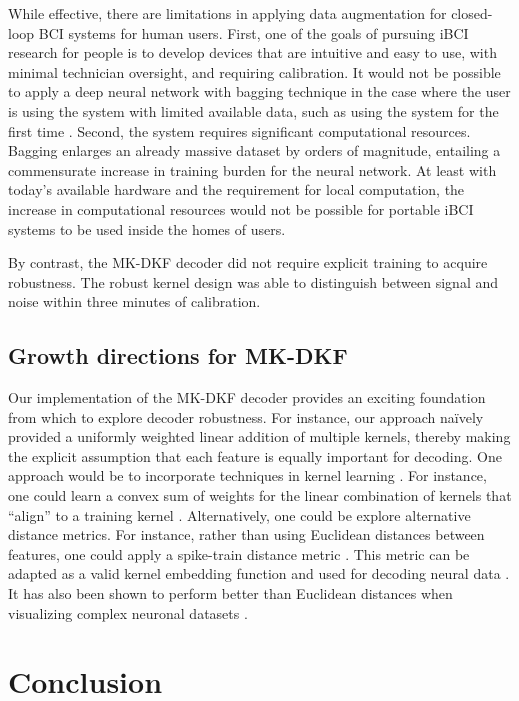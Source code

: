 While effective, there are limitations in applying data augmentation for closed-loop BCI systems for human users. First, one of the goals of pursuing iBCI research for people is to develop devices that are intuitive and easy to use, with minimal technician oversight, and requiring calibration. It would not be possible to apply a deep neural network with bagging technique in the case where the user is using the system with limited available data, such as using the system for the first time \cite{Brandman2018}. Second, the system requires significant computational resources. Bagging enlarges an already massive dataset by orders of magnitude, entailing a commensurate increase in training burden for the neural network. At least with today's available hardware and the requirement for local computation, the increase in computational resources would not be possible for portable iBCI systems to be used inside the homes of users.  

By contrast, the MK-DKF decoder did not require explicit training to acquire robustness. The robust kernel design was able to distinguish between signal and noise within three minutes of calibration.

\subsection{Growth directions for MK-DKF}

Our implementation of the MK-DKF decoder provides an exciting foundation from which to explore decoder robustness. For instance, our approach na\"ively provided a uniformly weighted linear addition of multiple kernels, thereby making the explicit assumption that each feature is equally important for decoding. One approach would be to incorporate techniques in kernel learning \cite{Gonen2011}. For instance, one could learn a convex sum of weights for the linear combination of kernels that ``align'' to a training kernel \cite{Cortes2012}. Alternatively, one could be explore alternative distance metrics. For instance, rather than using Euclidean distances between features, one could apply a spike-train distance metric \cite{Victor1997a}. This metric can be adapted as a valid kernel embedding function and used for decoding neural data \cite{Park2013, Brockmeier2014, Li2014}. It has also been shown to perform better than Euclidean distances when visualizing complex neuronal datasets \cite{Vargas-Irwin2015}.

\section{Conclusion}

